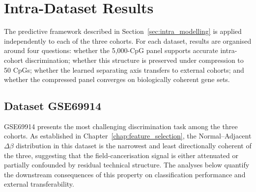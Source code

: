 \section{Intra-Dataset Results}

The predictive framework described in Section~\ref{sec:intra_modelling}
is applied independently to each of the three cohorts. For each
dataset, results are organised around four questions: whether
the 5,000-CpG panel supports accurate intra-cohort discrimination;
whether this structure is preserved under compression to 50 CpGs;
whether the learned separating axis transfers to external cohorts;
and whether the compressed panel converges on biologically
coherent gene sets. 

\subsection{Dataset GSE69914}
\label{sec:results_gse69914}

GSE69914 presents the most challenging discrimination task among the three
cohorts. As established in Chapter~\ref{chap:feature_selection}, the
Normal--Adjacent $\Delta\beta$ distribution in this dataset is the narrowest
and least directionally coherent of the three, suggesting that the
field-cancerisation signal is either attenuated or partially confounded by
residual technical structure. The analyses below quantify the downstream
consequences of this property on classification performance and external
transferability.

